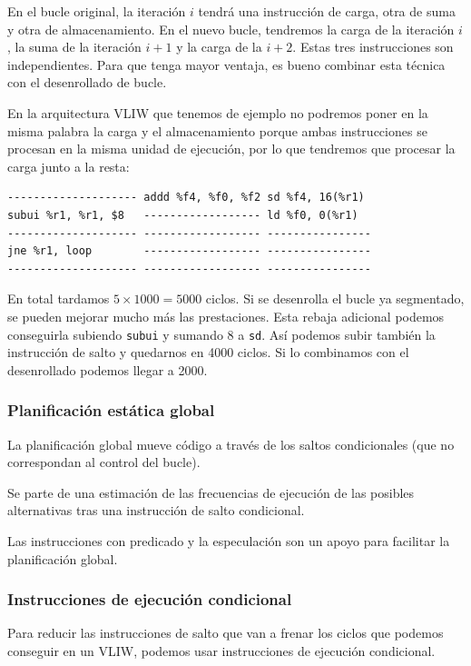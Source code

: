 \documentclass[10pt,a4paper,spanish]{report}
\begin{document}
En el bucle original, la iteración $i$ tendrá una instrucción de carga, otra de suma y otra de almacenamiento. En el nuevo bucle, tendremos la carga de la iteración $i$, la suma de la iteración $i+1$ y la carga de la $i+2$. Estas tres instrucciones son independientes. Para que tenga mayor ventaja, es bueno combinar esta técnica con el desenrollado de bucle. 

En la arquitectura VLIW que tenemos de ejemplo no podremos poner en la misma palabra la carga y el almacenamiento porque ambas instrucciones se procesan en la misma unidad de ejecución, por lo que tendremos que procesar la carga junto a la resta:

\begin{verbatim}
-------------------- addd %f4, %f0, %f2 sd %f4, 16(%r1)
subui %r1, %r1, $8   ------------------ ld %f0, 0(%r1)
-------------------- ------------------ ----------------
jne %r1, loop        ------------------ ----------------
-------------------- ------------------ ----------------
\end{verbatim}

En total tardamos $5 \times 1000 = 5000$ ciclos. Si se desenrolla el bucle ya segmentado, se pueden mejorar mucho más las prestaciones. Esta rebaja adicional podemos conseguirla subiendo \verb*|subui| y sumando 8 a \verb*|sd|. Así podemos subir también la instrucción de salto y quedarnos en 4000 ciclos. Si lo combinamos con el desenrollado podemos llegar a 2000.

\textcolor{azul}{\subsubsection{Planificación estática global}}
La planificación global mueve código a través de los saltos condicionales (que no correspondan al control del bucle).

Se parte de una estimación de las frecuencias de ejecución de las posibles alternativas tras una instrucción de salto condicional.

Las instrucciones con predicado y la especulación son un apoyo para facilitar la planificación global.

\newpage
\textcolor{azul}{\subsubsection{Instrucciones de ejecución condicional}}
Para reducir las instrucciones de salto que van a frenar los ciclos que podemos conseguir en un VLIW, podemos usar instrucciones de ejecución condicional.
\end{document}
